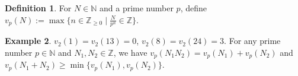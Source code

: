 \documentclass[12pt]{amsart}
\theoremstyle{definition}
\newtheorem{definition}{Definition}[section]
\newtheorem{proposition}[definition]{Proposition}
\newtheorem{example}[definition]{Example}
\newcommand{\NN}{\mathbb{N}}
\newcommand{\ZZ}{\mathbb{Z}}
\begin{document}
\begin{definition}\label{definition:p-value}
    For $N\in\NN$ and a prime number $p$, define 
    $v_p(N):=\max\{n\in\ZZ_{\geq0} \mid \frac{N}{p^n}\in\ZZ\}$.
\end{definition}
\begin{example}
    $v_2(1)=v_2(13)=0$, %
    $v_2(8)=v_2(24)=3$. 
    For any prime number $p\in\NN$ and $N_1,N_2\in\ZZ$, we have 
    $v_p(N_1N_2)=v_p(N_1)+v_p(N_2)$ and $v_p(N_1+N_2)\geq\min\{v_p(N_1),v_p(N_2)\}$.
\end{example}

%

\end{document}
